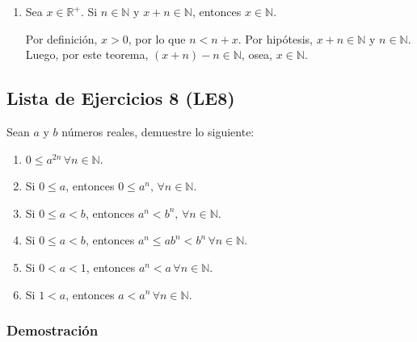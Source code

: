 \documentclass[11pt]{article}
\newcommand{\N}{\mathbb{N}}
\newcommand{\R}{\mathbb{R}}
\begin{document}
\begin{enumerate}[label=\alph*)]
\begin{enumerate}[label=\roman*)]
        \item Sea $x\in \R^+$. Si $n\in \N$ y $x+n\in \N$, entonces $x\in \N$.

        Por definición, $x>0$, por lo que $n<n+x$. Por hipótesis, $x+n\in \N$ y $n\in \N$. Luego, por este teorema, $(x+n)-n \in \N$, osea, $x\in \N$.
    \end{enumerate} %

\end{enumerate}

\subsection*{Lista de Ejercicios 8 (LE8)}

Sean $a$ y $b$ números reales, demuestre lo siguiente:

\begin{enumerate}[label=\alph*)]
    \item $0 \leq a^{2n} \, \forall n\in \N$.
    \item Si $0\leq a$, entonces $ 0 \leq a^n, \, \forall n\in \N$.
    \item Si $0 \leq a <b$, entonces $a^n < b^n, \, \forall n\in \N$.
    \item Si $0 \leq a <b$, entonces $a^n \leq ab^n < b^n \, \forall n\in \N$.
    \item Si $0<a<1$, entonces $a^n<a \, \forall n\in \N$.
    \item Si $1<a$, entonces $a<a^n \, \forall n\in \N$.
\end{enumerate}

\subsubsection*{Demostración}
\end{document}
